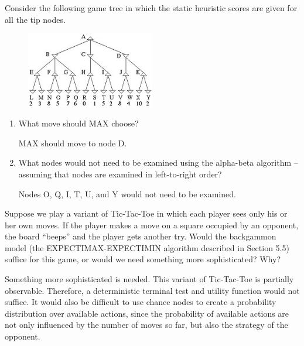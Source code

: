 \documentclass[12pt]{article}
\newenvironment{problem}[2][Problem]{\begin{trivlist}
\item[\hskip \labelsep {\bfseries #1}\hskip \labelsep {\bfseries #2.}]}{\end{trivlist}}
\begin{document}
\begin{problem}{3}
	Consider the following game tree in which the static heuristic scores are given for all the tip nodes.
	\begin{figure}[h]
		\centering
		\includegraphics[width=0.5\textwidth]{fig/gametree.jpg}
		\label{fig:gametreee}
	\end{figure}
	\begin{enumerate}
		\item What move should MAX choose?

			MAX should move to node D.
		\item What nodes would not need to be examined using the alpha-beta algorithm -- assuming that nodes are examined in left-to-right order?

			Nodes O, Q, I, T, U, and Y would not need to be examined.
	\end{enumerate}
\end{problem}
\begin{problem}{4}
	Suppose we play a variant of Tic-Tac-Toe in which each player sees only his or her own moves.
	If the player makes a move on a square occupied by an opponent, the board ``beeps'' and the player gets another try.
	Would the backgammon model (the EXPECTIMAX-EXPECTIMIN algorithm described in Section 5.5) suffice for this game, or would we need something more sophisticated? Why?

	\vspace{0.25cm}
	Something more sophisticated is needed.
	This variant of Tic-Tac-Toe is partially observable.
	Therefore, a deterministic terminal test and utility function would not suffice.
	It would also be difficult to use chance nodes to create a probability distribution over available actions,
	since the probability of available actions are not only influenced by the number of moves so far, but also the strategy of the opponent.
\end{problem}
\end{document}

